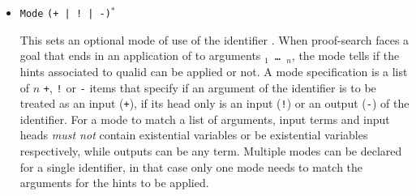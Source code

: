 \begin{coq_example*}
\begin{itemize}
  This command can be used to cut the proof-search tree according to a
  regular expression matching paths to be cut. The grammar for regular
  expressions is the following. Beware, there is no operator precedence
  during parsing, one can check with \texttt{Print HintDb} to verify the
  current cut expression:
\[\begin{array}{lcll}
  e & ::= & \ident & \text{ hint or instance identifier } \\
  & & \texttt{\_} & \text{ any hint } \\
  & & e | e' & \text{ disjunction } \\
  & & e e' & \text{ sequence } \\
  & & e * & \text{ Kleene star } \\
  & & \texttt{emp} & \text{ empty } \\
  & & \texttt{eps} & \text{ epsilon } \\
  & & \texttt{(} e \texttt{)} &
\end{array}\]

The \texttt{emp} regexp does not match any search path while
\texttt{eps} matches the empty path. During proof search, the path of
successive successful hints on a search branch is recorded, as a list of
identifiers for the hints (note \texttt{Hint Extern}'s do not have an
associated identifier). Before applying any hint $\ident$ the current
path $p$ extended with $\ident$ is matched against the current cut
expression $c$ associated to the hint database. If matching succeeds,
the hint is \emph{not} applied. The semantics of \texttt{Hint Cut} $e$
is to set the cut expression to $c | e$, the initial cut expression
being \texttt{emp}.


\item \texttt{Mode} {\qualid} {\tt (+ | ! | -)}$^*$
\label{HintMode}

This sets an optional mode of use of the identifier {\qualid}.  When
proof-search faces a goal that ends in an application of {\qualid} to
arguments {\tt \term$_1$ \mbox{\dots} \term$_n$}, the mode tells if the
hints associated to qualid can be applied or not. A mode specification
is a list of $n$ {\tt +}, {\tt !} or {\tt -} items that specify if an
argument of the identifier is to be treated as an input ({\tt +}), if
its head only is an input ({\tt !}) or an output ({\tt -}) of the
identifier. For a mode to match a list of arguments, input terms and
input heads \emph{must not} contain existential variables or be
existential variables respectively, while outputs can be any
term. Multiple modes can be declared for a single identifier, in that
case only one mode needs to match the arguments for the hints to be
applied.


\end{itemize}
\end{coq_example*}
